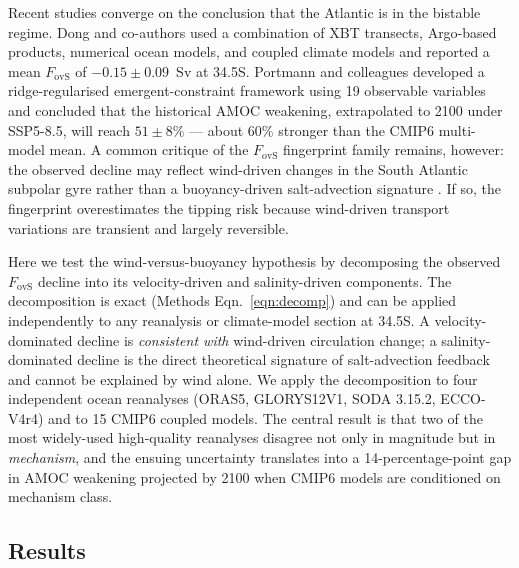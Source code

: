 \documentclass[12pt,a4paper]{article}
\newcommand{\Fovs}{F_\mathrm{ovS}}
\begin{document}
Recent studies converge on the conclusion that the Atlantic is in
the bistable regime. Dong and co-authors \citep{Dong2024} used a
combination of XBT transects, Argo-based products, numerical ocean
models, and coupled climate models and reported a mean $\Fovs$ of
${-0.15\pm 0.09}$~Sv at 34.5\textdegree S. Portmann and colleagues
\citep{Portmann2026} developed a ridge-regularised emergent-constraint
framework using 19 observable variables and concluded that the
historical AMOC weakening, extrapolated to 2100 under SSP5-8.5, will
reach ${51\pm 8}\%$ --- about $60\%$ stronger than the CMIP6
multi-model mean. A common critique of the $\Fovs$ fingerprint
family remains, however: the observed decline may reflect wind-driven
changes in the South Atlantic subpolar gyre rather than a
buoyancy-driven salt-advection signature \citep{Chemke2021}. If so,
the fingerprint overestimates the tipping risk because wind-driven
transport variations are transient and largely reversible.

Here we test the wind-versus-buoyancy hypothesis by decomposing the
observed $\Fovs$ decline into its velocity-driven and salinity-driven
components. The decomposition is exact (Methods Eqn.~\ref{eqn:decomp})
and can be applied independently to any reanalysis or climate-model
section at 34.5\textdegree S. A velocity-dominated decline is
\emph{consistent with} wind-driven circulation change; a
salinity-dominated decline is the direct theoretical signature of
salt-advection feedback and cannot be explained by wind alone. We
apply the decomposition to four independent ocean reanalyses (ORAS5,
GLORYS12V1, SODA 3.15.2, ECCO-V4r4) and to 15 CMIP6 coupled models.
The central result is that two of the most widely-used high-quality
reanalyses disagree not only in magnitude but in \emph{mechanism},
and the ensuing uncertainty translates into a 14-percentage-point gap
in AMOC weakening projected by 2100 when CMIP6 models are conditioned
on mechanism class.

\subsection*{Results}
\end{document}
